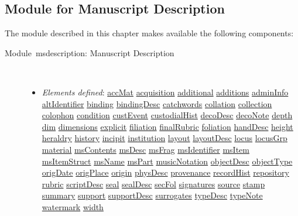 \subsection[{Module for Manuscript Description}]{Module for Manuscript Description}\label{MSref}\par
The module described in this chapter makes available the following components: \begin{description}

\item[{Module msdescription: Manuscript Description}]\hspace{1em}\hfill\linebreak
\mbox{}\\[-10pt] \begin{itemize}
\item {\itshape Elements defined}: \hyperref[TEI.accMat]{accMat} \hyperref[TEI.acquisition]{acquisition} \hyperref[TEI.additional]{additional} \hyperref[TEI.additions]{additions} \hyperref[TEI.adminInfo]{adminInfo} \hyperref[TEI.altIdentifier]{altIdentifier} \hyperref[TEI.binding]{binding} \hyperref[TEI.bindingDesc]{bindingDesc} \hyperref[TEI.catchwords]{catchwords} \hyperref[TEI.collation]{collation} \hyperref[TEI.collection]{collection} \hyperref[TEI.colophon]{colophon} \hyperref[TEI.condition]{condition} \hyperref[TEI.custEvent]{custEvent} \hyperref[TEI.custodialHist]{custodialHist} \hyperref[TEI.decoDesc]{decoDesc} \hyperref[TEI.decoNote]{decoNote} \hyperref[TEI.depth]{depth} \hyperref[TEI.dim]{dim} \hyperref[TEI.dimensions]{dimensions} \hyperref[TEI.explicit]{explicit} \hyperref[TEI.filiation]{filiation} \hyperref[TEI.finalRubric]{finalRubric} \hyperref[TEI.foliation]{foliation} \hyperref[TEI.handDesc]{handDesc} \hyperref[TEI.height]{height} \hyperref[TEI.heraldry]{heraldry} \hyperref[TEI.history]{history} \hyperref[TEI.incipit]{incipit} \hyperref[TEI.institution]{institution} \hyperref[TEI.layout]{layout} \hyperref[TEI.layoutDesc]{layoutDesc} \hyperref[TEI.locus]{locus} \hyperref[TEI.locusGrp]{locusGrp} \hyperref[TEI.material]{material} \hyperref[TEI.msContents]{msContents} \hyperref[TEI.msDesc]{msDesc} \hyperref[TEI.msFrag]{msFrag} \hyperref[TEI.msIdentifier]{msIdentifier} \hyperref[TEI.msItem]{msItem} \hyperref[TEI.msItemStruct]{msItemStruct} \hyperref[TEI.msName]{msName} \hyperref[TEI.msPart]{msPart} \hyperref[TEI.musicNotation]{musicNotation} \hyperref[TEI.objectDesc]{objectDesc} \hyperref[TEI.objectType]{objectType} \hyperref[TEI.origDate]{origDate} \hyperref[TEI.origPlace]{origPlace} \hyperref[TEI.origin]{origin} \hyperref[TEI.physDesc]{physDesc} \hyperref[TEI.provenance]{provenance} \hyperref[TEI.recordHist]{recordHist} \hyperref[TEI.repository]{repository} \hyperref[TEI.rubric]{rubric} \hyperref[TEI.scriptDesc]{scriptDesc} \hyperref[TEI.seal]{seal} \hyperref[TEI.sealDesc]{sealDesc} \hyperref[TEI.secFol]{secFol} \hyperref[TEI.signatures]{signatures} \hyperref[TEI.source]{source} \hyperref[TEI.stamp]{stamp} \hyperref[TEI.summary]{summary} \hyperref[TEI.support]{support} \hyperref[TEI.supportDesc]{supportDesc} \hyperref[TEI.surrogates]{surrogates} \hyperref[TEI.typeDesc]{typeDesc} \hyperref[TEI.typeNote]{typeNote} \hyperref[TEI.watermark]{watermark} \hyperref[TEI.width]{width}

\end{itemize}
\end{description}
